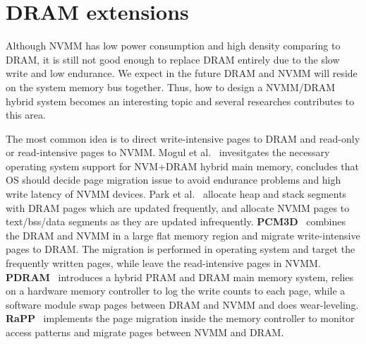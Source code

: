 \section{DRAM extensions} 
\label{sec:migration}

Although NVMM has low power consumption and high density comparing to DRAM,
it is still not good enough to replace DRAM entirely due to the slow write
and low endurance. We expect in the future DRAM and NVMM
will reside on the system memory bus together. Thus, how to design a
NVMM/DRAM hybrid system becomes an interesting
topic and several researches contributes to this area.

The most common idea is to direct write-intensive pages to DRAM and read-only
or read-intensive pages to NVMM.
Mogul et al.~\cite{Mogul} invesitgates the necessary operating system support
for NVM+DRAM hybrid main memory, concludes that OS should decide page
migration issue to avoid endurance problems and high write latency of NVMM
devices.
Park et al.~\cite{pcmalloc} allocate heap and stack segments with DRAM pages
which are
updated frequently, and allocate NVMM pages to text/bss/data segments as
they are updated infrequently.
\textbf{PCM3D}~\cite{pcm3d} combines the DRAM
and NVMM in a large flat memory region and migrate write-intensive pages
to DRAM. The migration is performed in operating system and target the
frequently written pages, while leave the read-intensive pages in NVMM.
\textbf{PDRAM}~\cite{pdram} introduces a hybrid PRAM and DRAM main memory
system, 
relies on a hardware memory controller to log the write counts to each page,
while a software module swap pages between DRAM and NVMM and does wear-leveling.
\textbf{RaPP}~\cite{RaPP} implements the page migration inside the memory
controller to monitor access patterns and migrate pages between NVMM and DRAM. 

